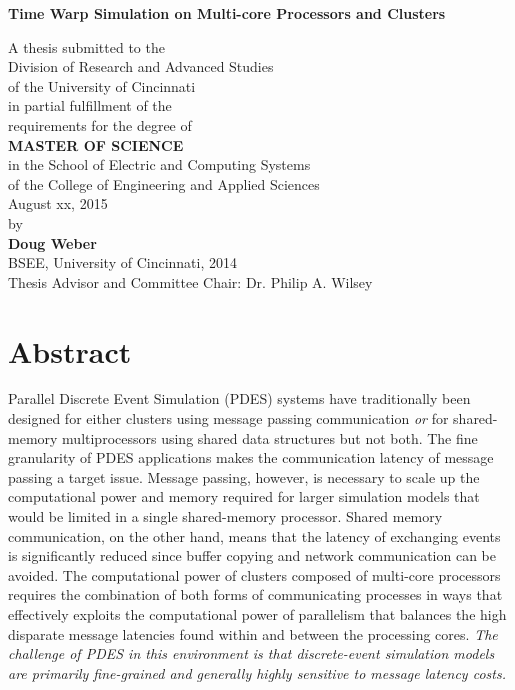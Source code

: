 \documentclass[11pt]{book}
\begin{document}
\thispagestyle{empty}

\doublespacing

\vspace*{0.5in}

\begin{center}
\LARGE{\textbf{Time Warp Simulation on Multi-core Processors and Clusters}}

\vspace*{0.4in}

  {\large A thesis submitted to the\\[0.20in]
    Division of Research and Advanced Studies\\
    of the University of Cincinnati\\[0.20in]
    in partial fulfillment of the\\
    requirements for the degree of\\[0.20in]
    \textbf{MASTER OF SCIENCE}\\[0.20in]
    in the School of Electric and Computing Systems\\
    of the College of Engineering and Applied Sciences\\[0.20in]
    August xx, 2015\\[0.20in]
    by\\[0.20in]
    \textbf{Doug Weber}\\
    BSEE, University of Cincinnati, 2014\\}
  \vspace{0.5in}
  {\large Thesis Advisor and Committee Chair:  Dr. Philip A. Wilsey}
\end{center}

\clearpage

\setcounter{page}{1}
\clearpage

\chapter*{Abstract}

Parallel Discrete Event Simulation (PDES) systems have traditionally been designed for either
clusters using message passing communication \emph{or} for shared-memory multiprocessors using
shared data structures but not both.  The fine granularity of PDES applications makes the
communication latency of message passing a target issue.  Message passing, however, is necessary to
scale up the computational power and memory required for larger simulation models that would be
limited in a single shared-memory processor.  Shared memory communication, on the other hand, means
that the latency of exchanging events is significantly reduced since buffer copying and network
communication can be avoided.  The computational power of clusters composed of multi-core processors
requires the combination of both forms of communicating processes in ways that effectively exploits
the computational power of parallelism that balances the high disparate message latencies found
within and between the processing cores.  \emph{The challenge of PDES in this environment is that
  discrete-event simulation models are primarily fine-grained and generally highly sensitive to
  message latency costs.}
\end{document}
